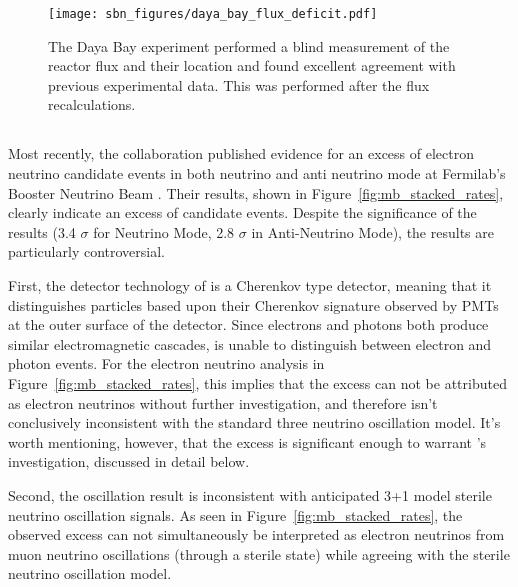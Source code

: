 \begin{figure}[htbp]
  \centering
  \texttt{[image: sbn\_figures/daya\_bay\_flux\_deficit.pdf]}
  \caption[Daya Bay Reactor Flux]{The Daya Bay experiment performed a blind measurement of the reactor flux and their location and found excellent agreement with previous experimental data.  This was performed after the flux recalculations.}
  \label{fig:daya_bay_reactor_flux}
\end{figure}




\subsection{\label{sec:miniboone} \MB}

Most recently, the \MB collaboration published evidence for an excess of electron neutrino candidate events in both neutrino and anti neutrino mode at Fermilab's Booster Neutrino Beam \cite{Aguilar-Arevalo:2013pmq}.  Their results, shown in Figure~\ref{fig:mb_stacked_rates}, clearly indicate an excess of candidate events.  Despite the significance of the results (3.4 $\sigma$ for Neutrino Mode, 2.8 $\sigma$ in Anti-Neutrino Mode), the \MB results are particularly controversial.

First, the detector technology of \MB is a Cherenkov type detector, meaning that it distinguishes particles based upon their Cherenkov signature observed by PMTs at the outer surface of the detector.  Since electrons and photons both produce similar electromagnetic cascades, \MB is unable to distinguish between electron and photon events.  For the electron neutrino analysis in Figure~\ref{fig:mb_stacked_rates}, this implies that the excess can not be attributed as electron neutrinos without further investigation, and therefore isn't conclusively inconsistent with the standard three neutrino oscillation model.  It's worth mentioning, however, that the excess is significant enough to warrant \uboone's investigation, discussed in detail below.

Second, the \MB oscillation result is inconsistent with anticipated 3+1 model sterile neutrino oscillation signals.  As seen in Figure~\ref{fig:mb_stacked_rates}, the observed excess can not simultaneously be interpreted as electron neutrinos from muon neutrino oscillations (through a sterile state) while agreeing with the sterile neutrino oscillation model.

